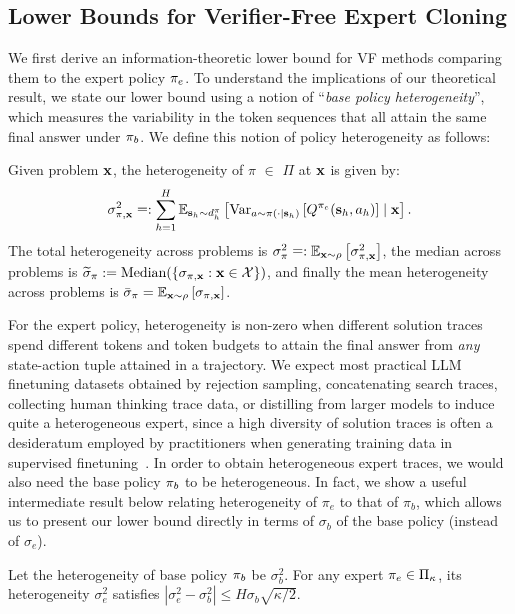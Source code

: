 \subsection{Lower Bounds for Verifier-Free Expert Cloning}
\label{subsec:verifier-free}
\vspace{-0.1cm}
We first derive an information-theoretic lower bound for VF methods comparing them to the expert policy $\pi_e$. To understand the implications of our theoretical result, we state our lower bound using a notion of ``\emph{base policy heterogeneity}'', which measures the variability in the token sequences that all attain the same final answer under $\pi_b$. We define this notion of policy heterogeneity as follows:
{
\setlength{\abovedisplayskip}{-10pt}
\setlength{\belowdisplayskip}{-10pt}
\begin{tcolorbox}[colback=green!5!white,colframe=black,boxsep=0pt,top=4pt,bottom=4pt,left=3pt,right=3pt]
\begin{property}
    \label{def:exp-heterogeneity}
    Given problem $\mathbf{x}$, the heterogeneity of $\pi$ $\in$ $\Pi$ at $\mathbf{x}$ is given by:
    {
    \setlength{\abovedisplayskip}{6pt}
    \setlength{\belowdisplayskip}{6pt}
    \begin{align*}    
    \sigma^2_{\pi, \mathbf{x}} \mathrel{\mathop=}: \sum_{h=1}^{H} \mathbb{E}_{\mathbf{s}_h \sim d^{\pi}_{h}}\left [ \mathrm{Var}_{a\sim\pi(\cdot \mid \mathbf{s}_h)}\left [ Q^{\pi_e}(\mathbf{s}_h, a_h) \right ] \mid \mathbf{x} \right ]. 
\end{align*}}The total heterogeneity across problems is  $\sigma^2_\pi \mathrel{\mathop=}: \mathbb{E}_{\mathbf{x} \sim \rho} \left [ \sigma_{\pi, \mathbf{x}}^2 \right ]$, the median across problems  is $\widetilde{\sigma}_\pi := \text{Median}(\left \{ \sigma_{\pi, \mathbf{x}} : \mathbf{x} \in {\mathcal{X}} \right \})$, and finally the mean heterogeneity across problems is $\bar{\sigma}_\pi = \mathbb{E}_{\mathbf{x} \sim \rho} \left [ \sigma_{\pi, \mathbf{x}} \right ]$. 
\end{property}
\end{tcolorbox}
}
For the expert policy, heterogeneity is non-zero when different solution traces spend different tokens and token budgets to attain the final answer from \emph{any} state-action tuple attained in a trajectory. We expect most practical LLM finetuning datasets obtained by rejection sampling, concatenating search traces, collecting human thinking trace data, or distilling from larger models to induce quite a heterogeneous expert, since a high diversity of solution traces is often a desideratum employed by practitioners when generating training data in supervised finetuning~\citep{chen2024diversity}.
In order to obtain heterogeneous expert traces, we would also need the base policy $\pi_b$ to be heterogeneous.
In fact, we show a useful intermediate result below relating heterogeneity of $\pi_e$ to that of $\pi_b$, which allows us to present our lower bound directly in terms of ${\sigma}_b$ of the base policy (instead of $\sigma_e$).
\begin{lemma}
\label{lem:expert-variance-lower-bound}
Let the  heterogeneity of base policy $\pi_b$ be $\sigma^2_b$. 
For any expert $\pi_e \in \Pi_\kappa$, its heterogeneity $\sigma^2_e$ satisfies $ |\sigma^2_{{e}} - \sigma^2_b| \le H\sigma_b \sqrt{\kappa/2}$.

\end{lemma}


